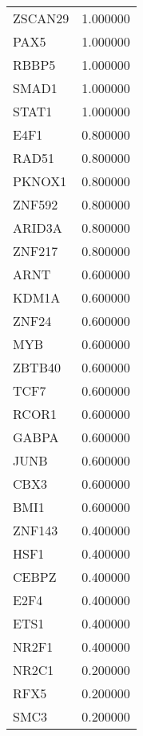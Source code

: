 \begin{longtable}{lr}
         ZSCAN29 &  1.000000 \\
            PAX5 &  1.000000 \\
           RBBP5 &  1.000000 \\
           SMAD1 &  1.000000 \\
           STAT1 &  1.000000 \\
            E4F1 &  0.800000 \\
           RAD51 &  0.800000 \\
          PKNOX1 &  0.800000 \\
          ZNF592 &  0.800000 \\
          ARID3A &  0.800000 \\
          ZNF217 &  0.800000 \\
            ARNT &  0.600000 \\
           KDM1A &  0.600000 \\
           ZNF24 &  0.600000 \\
             MYB &  0.600000 \\
          ZBTB40 &  0.600000 \\
            TCF7 &  0.600000 \\
           RCOR1 &  0.600000 \\
           GABPA &  0.600000 \\
            JUNB &  0.600000 \\
            CBX3 &  0.600000 \\
            BMI1 &  0.600000 \\
          ZNF143 &  0.400000 \\
            HSF1 &  0.400000 \\
           CEBPZ &  0.400000 \\
            E2F4 &  0.400000 \\
            ETS1 &  0.400000 \\
           NR2F1 &  0.400000 \\
           NR2C1 &  0.200000 \\
            RFX5 &  0.200000 \\
            SMC3 &  0.200000 \\
\end{longtable}

